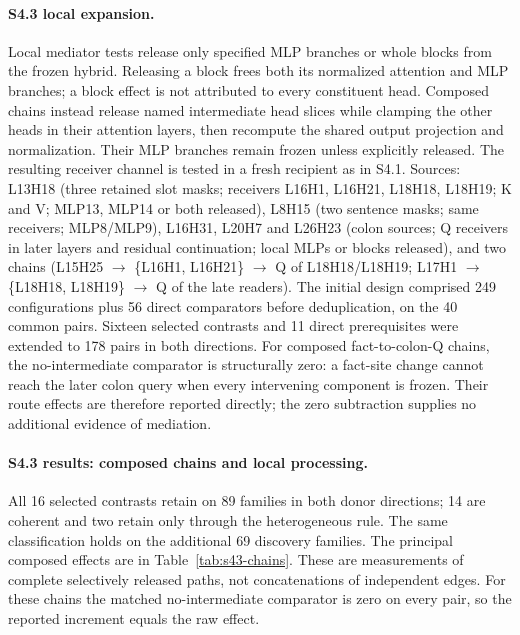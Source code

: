 \paragraph{S4.3 local expansion.}
Local mediator tests release only specified MLP branches or whole blocks from the
frozen hybrid. Releasing a block frees both its normalized attention and MLP
branches; a block effect is not attributed to every constituent head. Composed
chains instead release named intermediate head slices while clamping the other
heads in their attention layers, then recompute the shared output projection and
normalization. Their MLP branches remain frozen unless explicitly released.
The resulting receiver channel is tested in a fresh recipient as in S4.1.
Sources: L13H18 (three retained slot masks; receivers L16H1, L16H21, L18H18,
L18H19; K and V; MLP13, MLP14 or both released), L8H15 (two sentence masks; same
receivers; MLP8/MLP9), L16H31, L20H7 and L26H23 (colon sources; Q receivers in
later layers and residual continuation; local MLPs or blocks released), and two
chains (L15H25 $\to$ \{L16H1, L16H21\} $\to$ Q of L18H18/L18H19; L17H1 $\to$
\{L18H18, L18H19\} $\to$ Q of the late readers). The initial design comprised
249 configurations plus 56 direct comparators before deduplication, on the 40
common pairs. Sixteen selected contrasts and 11 direct prerequisites were extended
to 178 pairs in both directions. For composed fact-to-colon-Q chains, the
no-intermediate comparator is structurally zero: a fact-site change cannot reach
the later colon query when every intervening component is frozen. Their route
effects are therefore reported directly; the zero subtraction supplies no
additional evidence of mediation.

\paragraph{S4.3 results: composed chains and local processing.}
\label{app:s43-results}
All 16 selected contrasts retain on 89 families in both donor directions;
14 are coherent and two retain only through the heterogeneous rule. The same
classification holds on the additional 69 discovery families. The principal
composed effects are in Table~\ref{tab:s43-chains}. These are measurements of
complete selectively released paths, not concatenations of independent edges.
For these chains the matched no-intermediate comparator is zero on every pair,
so the reported increment equals the raw effect.

